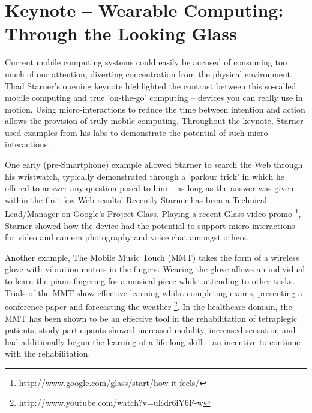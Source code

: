 \section{Keynote -- Wearable Computing: Through the Looking Glass}
\label{sec:keynote}
Current mobile computing systems could easily be accused of consuming too much
of our attention, diverting concentration from the physical environment. Thad
Starner's opening keynote highlighted the contrast between this so-called
mobile computing and true 'on-the-go' computing -- devices you can really use in
motion. Using micro-interactions to reduce the time between intention and action
allows the provision of truly mobile computing. Throughout the keynote, Starner
used examples from his labs to demonstrate the potential of such micro interactions.


One early (pre-Smartphone) example allowed Starner to search the Web through
his wristwatch, typically demonstrated through a 'parlour trick' in which he
offered to answer any question posed to him -- as long as the answer was given
within the first few Web results!
Recently Starner has been a Technical Lead/Manager on Google's Project Glass.
Playing a recent Glass video promo
\footnote{http://www.google.com/glass/start/how-it-feels/}, Starner showed how
the device had the potential to support micro interactions for video and camera
photography and voice chat amongst others.

Another example, The Mobile Music Touch (MMT) takes the form of a wireless glove
with vibration motors in the fingers. Wearing the glove allows an individual to
learn the piano fingering for a musical piece whilst attending to other tasks.
Trials of the MMT show effective learning whilst completing exams, presenting a
conference paper and forecasting the weather
\footnote{http://www.youtube.com/watch?v=uEdr6iY6F-w}. In the healthcare domain,
the MMT has been shown to be an effective tool in the rehabilitation of
tetraplegic patients; study participants showed increased mobility, increased
sensation and had additionally begun the learning of a life-long skill -- an
incentive to continue with the rehabilitation.

